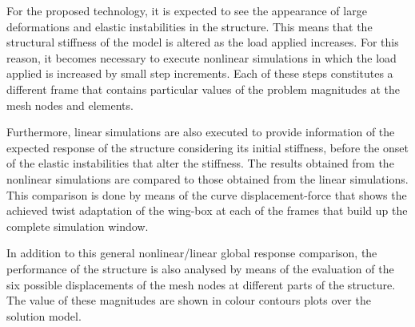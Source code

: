   For the proposed technology, it is expected to see the appearance of large deformations and elastic instabilities in the structure. This means that the structural stiffness of the model is altered as the load applied increases. For this reason, it becomes necessary to execute nonlinear simulations in which the load applied is increased by small step increments. Each of these steps constitutes a different frame that contains particular values of the problem magnitudes at the mesh nodes and elements.

  Furthermore, linear simulations are also executed to provide information of the expected response of the structure considering its initial stiffness, before the onset of the elastic instabilities that alter the stiffness. The results obtained from the nonlinear simulations are compared to those obtained from the linear simulations. This comparison is done by means of the curve displacement-force that shows the achieved twist adaptation of the wing-box at each of the frames that build up the complete simulation window.

  In addition to this general nonlinear/linear global response comparison, the performance of the structure is also analysed by means of the evaluation of the six possible displacements of the mesh nodes at different parts of the structure. The value of these magnitudes are shown in colour contours plots over the solution model.

